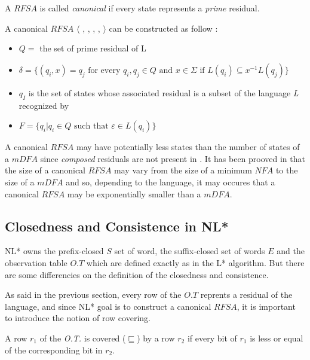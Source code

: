 \begin{definition}
  A $RFSA$ is called \textit{canonical} if every state represents a \textit{prime} residual.
\end{definition}

A canonical $RFSA$ $\langle$ \alphabet{}, \states{}, \transition{}, \qzero{}, \qend{} $\rangle$ can be constructed as follow :
\begin{itemize}
  \item $Q = $ the set of prime residual of L
  \item $\delta = \{(q_i, x) = q_j \text{ for every } q_i, q_j \in Q \text{ and } x \in \Sigma \text{ if } L(q_i) \subseteq x^{-1}L(q_j)\}$
  \item $q_I$ is the set of states whose associated residual is a subset of the language \textit{L} recognized by \automaton{}
  \item $F = \{q_i | q_i \in Q \text{ such that } \varepsilon \in L(q_i)\}$
\end{itemize}

A canonical $RFSA$ \automaton{} may have potentially less states than the number of states of a $mDFA$ since \textit{composed} residuals are not present in  \automaton{}. It has been prooved in  \cite{RFSA} that the size of a canonical $RFSA$ may vary from the size of a minimum $NFA$ to the size of a $mDFA$ and so, depending to the language, it may occures that a canonical $RFSA$ may be exponentially smaller than a $mDFA$.

\subsection{Closedness and Consistence in NL*}

NL* owns the prefix-closed $S$ set of word, the suffix-closed set of words $E$ and the observation table $O.T$ which are defined exactly as in the L* algorithm. But there are some differencies on the definition of the closedness and consistence.

As said in the previous section, every row of the $O.T$ reprents a residual of the language, and since NL* goal is to construct a canonical $RFSA$, it is important to introduce the notion of row covering.

\begin{definition}
  \label{def:row-covering}
  A row $r_1$ of the \textit{O.T.} is covered ($\sqsubseteq$) by a row $r_2$ if every bit of $r_1$ is less or equal of the corresponding bit in $r_2$.
\end{definition}

